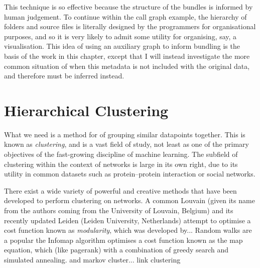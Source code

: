This technique is so effective because the structure of the bundles is informed by human judgement. To continue within the call graph example, the hierarchy of folders and source files is literally designed by the programmers for organisational purposes, and so it is very likely to admit some utility for organising, say, a visualisation.
This idea of using an auxiliary graph to inform bundling is the basis of the work in this chapter, except that I will instead investigate the more common situation of when this metadata is not included with the original data, and therefore must be inferred instead.

\section{Hierarchical Clustering}
What we need is a method for of grouping similar datapoints together. This is known as \textit{clustering}, and is a vast field of study, not least as one of the primary objectives of the fast-growing discipline of machine learning. The subfield of clustering within the context of networks is large in its own right, due to its utility in common datasets such as protein--protein interaction or social networks.

There exist a wide variety of powerful and creative methods that have been developed to perform clustering on networks. A common 
Louvain (given its name from the authors coming from the University of Louvain, Belgium) and its recently updated Leiden (Leiden University, Netherlands) attempt to optimise a cost function known as \textit{modularity}, which was developed by...
Random walks are a popular the Infomap algorithm optimises a cost function known as the map equation, which (like pagerank) with a combination of greedy search and simulated annealing.
and markov cluster...
link clustering

